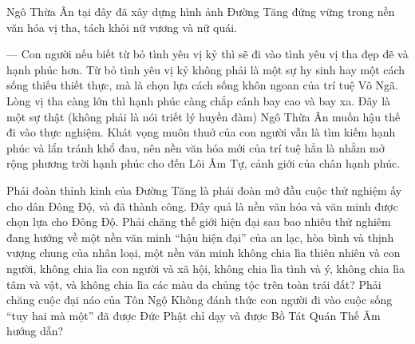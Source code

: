 Ngô Thừa Ân tại đây đã xây dựng hình ảnh Đường Tăng đứng vững trong nền văn hóa vị tha, tách khỏi nữ vương và nữ quái.

— Con người nếu biết từ bỏ tình yêu vị kỷ thì sẽ đi vào tình yêu vị tha đẹp đẽ và hạnh phúc hơn. Từ bỏ tình yêu vị kỷ không phải là một sự hy sinh hay một cách sống thiếu thiết thực, mà là chọn lựa cách sống khôn ngoan của trí tuệ Vô Ngã. Lòng vị tha càng lớn thì hạnh phúc càng chắp cánh bay cao và bay xa. Đây là một sự thật (không phải là nói triết lý huyền đàm) Ngô Thừa Ân muốn hậu thế đi vào thực nghiệm. Khát vọng muôn thuở của con người vẫn là tìm kiếm hạnh phúc và lẩn tránh khổ đau, nên nền văn hóa mới của trí tuệ hẳn là nhằm mở rộng phương trời hạnh phúc cho đến Lôi Âm Tự, cảnh giới của chân hạnh phúc.

Phái đoàn thỉnh kinh của Đường Tăng là phái đoàn mở đầu cuộc thử nghiệm ấy cho dân Đông Độ, và đã thành công. Đây quả là nền văn hóa và văn minh được chọn lựa cho Đông Độ. Phải chăng thế giới hiện đại sau bao nhiêu thử nghiêm đang hướng về một nền văn minh ``hậu hiện đại'' của an lạc, hòa bình và thịnh vượng chung của nhân loại, một nền văn minh không chia lìa thiên nhiên và con người, không chia lìa con người và xã hội, không chia lìa tình và ý, không chia lìa tâm và vật, và không chia lìa các màu da chủng tộc trên toàn trái đất? Phải chăng cuộc đại náo của Tôn Ngộ Không đánh thức con người đi vào cuộc sống ``tuy hai mà một'' đã được Đức Phật chỉ dạy và được Bồ Tát Quán Thế Âm hướng dẫn?

